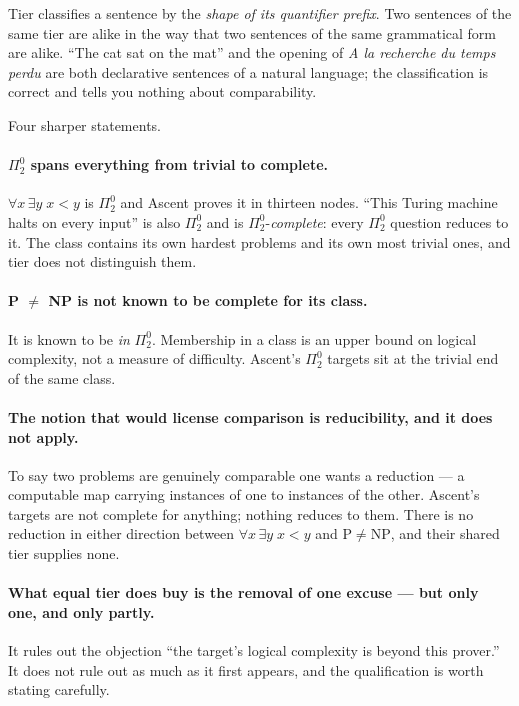 \documentclass[11pt,a4paper]{article}
\newcommand{\Pai}[2]{\Pi^{#1}_{#2}}
\begin{document}
Tier classifies a sentence by the \emph{shape of its quantifier prefix}. Two
sentences of the same tier are alike in the way that two sentences of the same
grammatical form are alike. ``The cat sat on the mat'' and the opening of
\emph{A la recherche du temps perdu} are both declarative sentences of a
natural language; the classification is correct and tells you nothing about
comparability.

Four sharper statements.

\paragraph{$\Pai{0}{2}$ spans everything from trivial to complete.}
$\forall x\, \exists y\; x < y$ is $\Pai{0}{2}$ and Ascent proves it in
thirteen nodes. ``This Turing machine halts on every input'' is also
$\Pai{0}{2}$ and is $\Pai{0}{2}$-\emph{complete}: every $\Pai{0}{2}$ question
reduces to it. The class contains its own hardest problems and its own most
trivial ones, and tier does not distinguish them.

\paragraph{P $\neq$ NP is not known to be complete for its class.} It is known
to be \emph{in} $\Pai{0}{2}$. Membership in a class is an upper bound on
logical complexity, not a measure of difficulty. Ascent's $\Pai{0}{2}$ targets
sit at the trivial end of the same class.

\paragraph{The notion that would license comparison is reducibility, and it
does not apply.} To say two problems are genuinely comparable one wants a
reduction --- a computable map carrying instances of one to instances of the
other. Ascent's targets are not complete for anything; nothing reduces to
them. There is no reduction in either direction between $\forall x\,\exists
y\; x<y$ and $\mathrm{P} \neq \mathrm{NP}$, and their shared tier supplies
none.

\paragraph{What equal tier does buy is the removal of one excuse ---
but only one, and only partly.} It rules out the objection ``the target's
logical complexity is beyond this prover.'' It does not rule out as much as it
first appears, and the qualification is worth stating carefully.
\end{document}
